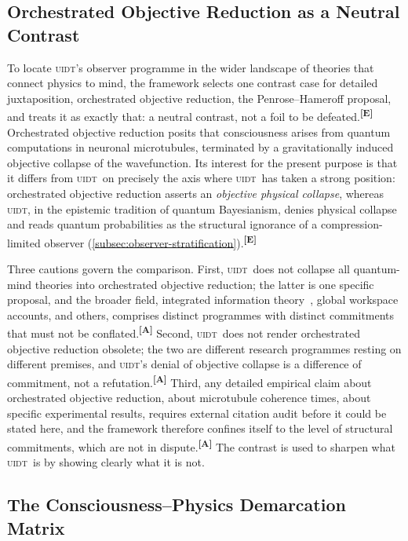 \documentclass[12pt,a4paper,twoside]{article}
\theoremstyle{plain}
\theoremstyle{definition}
\theoremstyle{remark}
\newcommand{\UIDT}{\textsc{uidt}}
\newcommand{\catmark}[1]{\textsuperscript{\textsf{\textbf{[#1]}}}}
\begin{document}
\subsection{Orchestrated Objective Reduction as a Neutral Contrast}
\label{subsec:orch-or}

To locate \UIDT's observer programme in the wider landscape of theories that connect physics to mind, the framework selects one contrast case for detailed juxtaposition, orchestrated objective reduction, the Penrose--Hameroff proposal, and treats it as exactly that: a neutral contrast, not a foil to be defeated.\catmark{E} Orchestrated objective reduction posits that consciousness arises from quantum computations in neuronal microtubules, terminated by a gravitationally induced objective collapse of the wavefunction. Its interest for the present purpose is that it differs from \UIDT\ on precisely the axis where \UIDT\ has taken a strong position: orchestrated objective reduction asserts an \emph{objective physical collapse}, whereas \UIDT, in the epistemic tradition of quantum Bayesianism, denies physical collapse and reads quantum probabilities as the structural ignorance of a compression-limited observer (\cref{subsec:observer-stratification}).\catmark{E}

Three cautions govern the comparison. First, \UIDT\ does not collapse all quantum-mind theories into orchestrated objective reduction; the latter is one specific proposal, and the broader field, integrated information theory~\cite{tononi2004}, global workspace accounts, and others, comprises distinct programmes with distinct commitments that must not be conflated.\catmark{A} Second, \UIDT\ does not render orchestrated objective reduction obsolete; the two are different research programmes resting on different premises, and \UIDT's denial of objective collapse is a difference of commitment, not a refutation.\catmark{A} Third, any detailed empirical claim about orchestrated objective reduction, about microtubule coherence times, about specific experimental results, requires external citation audit before it could be stated here, and the framework therefore confines itself to the level of structural commitments, which are not in dispute.\catmark{A} The contrast is used to sharpen what \UIDT\ is by showing clearly what it is not.

\subsection{The Consciousness--Physics Demarcation Matrix}
\label{subsec:demarcation-matrix}
\end{document}
